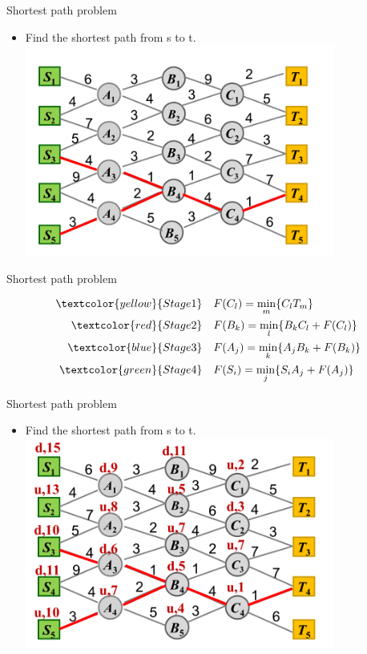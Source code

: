     \begin{frame}{Shortest path problem}
      \begin{itemize}
        \item Find the shortest path from s to t.
        \centering
        \includegraphics[width = 0.8\textwidth]{images/Shortest3.png}
      \end{itemize}
    \end{frame}

    \begin{frame}{Shortest path problem}
    \begin{spacing}{2}
    \begin{equation*}
      \begin{align}
    \textcolor{yellow}{Stage 1}\quad &F(C_l) = \min_m\{C_lT_m\} \\
    \textcolor{red}{Stage 2}\quad &F(B_k) = \min_l\{B_kC_l+F(C_l)\} \\
    \textcolor{blue}{Stage 3}\quad &F(A_j) = \min_k\{A_jB_k+F(B_k)\} \\
    \textcolor{green}{Stage 4}\quad &F(S_i) = \min_j\{S_iA_j+F(A_j)\}
      \end{align}
    \end{equation*}
    \end{spacing}
    \end{frame}

    \begin{frame}{Shortest path problem}
      \begin{itemize}
        \item Find the shortest path from s to t.
        \centering
        \includegraphics[width = 0.8\textwidth]{images/Shortest2.png}
      \end{itemize}
    \end{frame}

